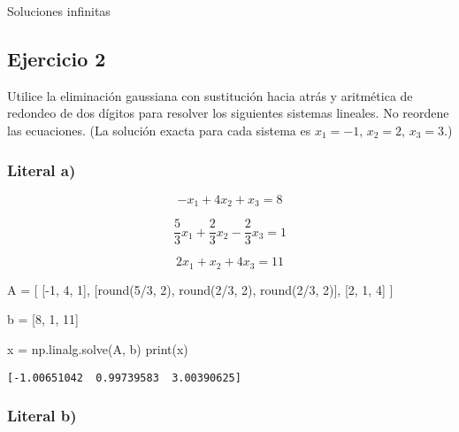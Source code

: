\documentclass[
  letterpaper,
  DIV=11,
  numbers=noendperiod]{scrartcl}
\newenvironment{Shaded}{\begin{snugshade}}{\end{snugshade}}
\newcommand{\BuiltInTok}[1]{\textcolor[rgb]{0.00,0.23,0.31}{#1}}
\newcommand{\DecValTok}[1]{\textcolor[rgb]{0.68,0.00,0.00}{#1}}
\newcommand{\NormalTok}[1]{\textcolor[rgb]{0.00,0.23,0.31}{#1}}
\newcommand{\OperatorTok}[1]{\textcolor[rgb]{0.37,0.37,0.37}{#1}}
\begin{document}
Soluciones infinitas

\subsection{Ejercicio 2}\label{ejercicio-2}

Utilice la eliminación gaussiana con sustitución hacia atrás y
aritmética de redondeo de dos dígitos para resolver los siguientes
sistemas lineales. No reordene las ecuaciones. (La solución exacta para
cada sistema es \(x_1 = -1\), \(x_2 = 2\), \(x_3 = 3\).)

\subsubsection{Literal a)}\label{literal-a-1}

\[-x_1 + 4x_2 + x_3 = 8\]

\[\frac{5}{3}x_1 + \frac{2}{3}x_2 - \frac{2}{3}x_3= 1\]

\[2x_1 + x_2 + 4x_3 = 11\]

\begin{Shaded}
\begin{Highlighting}[]

\NormalTok{A }\OperatorTok{=}\NormalTok{ [}
\NormalTok{    [}\OperatorTok{{-}}\DecValTok{1}\NormalTok{, }\DecValTok{4}\NormalTok{, }\DecValTok{1}\NormalTok{],}
\NormalTok{    [}\BuiltInTok{round}\NormalTok{(}\DecValTok{5}\OperatorTok{/}\DecValTok{3}\NormalTok{, }\DecValTok{2}\NormalTok{), }\BuiltInTok{round}\NormalTok{(}\DecValTok{2}\OperatorTok{/}\DecValTok{3}\NormalTok{, }\DecValTok{2}\NormalTok{), }\BuiltInTok{round}\NormalTok{(}\DecValTok{2}\OperatorTok{/}\DecValTok{3}\NormalTok{, }\DecValTok{2}\NormalTok{)],}
\NormalTok{    [}\DecValTok{2}\NormalTok{, }\DecValTok{1}\NormalTok{, }\DecValTok{4}\NormalTok{]}
\NormalTok{]}

\NormalTok{b }\OperatorTok{=}\NormalTok{ [}\DecValTok{8}\NormalTok{, }\DecValTok{1}\NormalTok{, }\DecValTok{11}\NormalTok{]}

\NormalTok{x }\OperatorTok{=}\NormalTok{ np.linalg.solve(A, b)}
\BuiltInTok{print}\NormalTok{(x)}
\end{Highlighting}
\end{Shaded}

\begin{verbatim}
[-1.00651042  0.99739583  3.00390625]
\end{verbatim}

\subsubsection{Literal b)}\label{literal-b-1}
\end{document}
